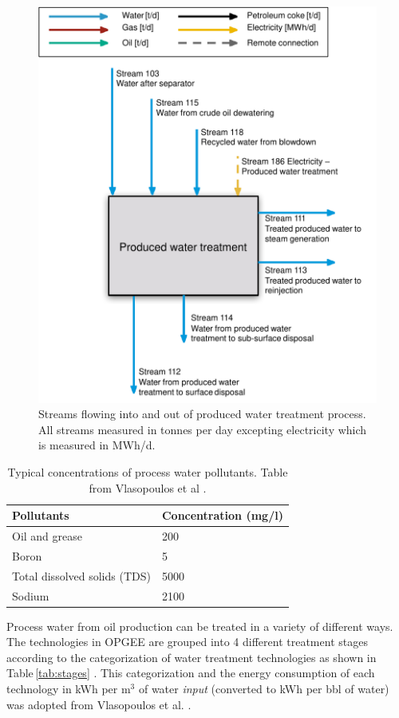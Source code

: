 \documentclass[11pt]{report}
\begin{document}
\begin{figure}
\includegraphics[width=0.8\columnwidth]{images/Produced_water_treatment_PF.pdf}
\caption{Streams flowing into and out of produced water treatment process. All streams measured in tonnes per day excepting electricity which is measured in MWh/d.}
\label{fig:produced_water_treatment_PF}
\end{figure}



\begin{table}
\begin{scriptsize}
\caption{Typical concentrations of process water pollutants. Table from Vlasopoulos et al \cite{Vlasopoulos2006}.}
\label{tab:water_quality}
\begin{tabular*}{0.75\columnwidth}{p{}p{}}
\toprule
Pollutants & Concentration (mg/l) \\
\midrule
Oil and grease & 200 \\
Boron & 5 \\
Total dissolved solids (TDS) & 5000 \\
Sodium & 2100 \\
\bottomrule
\end{tabular*}
\end{scriptsize}
\end{table}

Process water from oil production can be treated in a variety of different ways. The technologies in OPGEE are grouped into 4 different treatment stages according to the categorization of water treatment technologies as shown in Table\,\ref{tab:stages} \cite{Dillon2003}. This categorization and the energy consumption of each technology in kWh per m$^3$ of water \textit{input} (converted to kWh per bbl of water) was adopted from Vlasopoulos et al. \cite{Vlasopoulos2006}.
\end{document}
